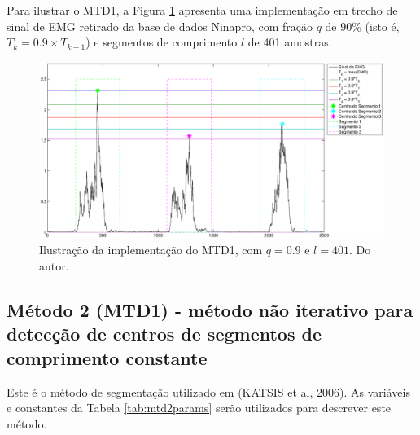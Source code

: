 \documentclass[
	12pt,				%
	openright,			%
	oneside,
	a4paper,			%
	english,			%
	francais,			%
	spanish,			%
	brazil				%
	]{abntex2}
\begin{document}
	Para ilustrar o MTD1, a Figura \ref{fig:mtd1example} apresenta uma implementação em trecho de sinal de EMG retirado da base de dados Ninapro, com fração $q$ de 90\% (isto é, $T_k = 0.9\times T_{k-1}$) e segmentos de comprimento $l$ de 401 amostras.
 
\begin{figure}
\centering
\includegraphics[width=\linewidth]{./img/mtd1example.eps}
\caption{Ilustração da implementação do MTD1, com $q = 0.9$ e $l = 401$. Do autor.}
\label{fig:mtd1example}
\end{figure}
 
\subsection{Método 2 (MTD1) - método não iterativo para detecção de centros de segmentos de comprimento constante}
	Este é o método de segmentação utilizado em (KATSIS et al, 2006). As variáveis e constantes da Tabela \ref{tab:mtd2params} serão utilizados para descrever este método. 
	
\begin{table}[htb]
\end{table}
	
\end{document}
